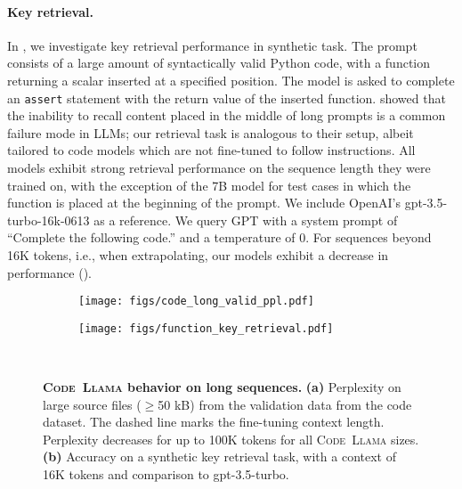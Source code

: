 \documentclass[10pt]{article}
\newcommand{\model}{\textsc{Code~Llama}\xspace}
\begin{document}
\paragraph{Key retrieval.} In , we investigate key retrieval performance in synthetic task.
The prompt consists of a large amount of syntactically valid Python code, with a function returning a scalar inserted at a specified position.
The model is asked to complete an \texttt{assert} statement with the return value of the inserted function.
\citet{liu2023lost} showed that the inability to recall content placed in the middle of long prompts is a common failure mode in LLMs; our retrieval task is analogous to their setup, albeit tailored to code models which are not fine-tuned to follow instructions. 
All models exhibit strong retrieval performance on the sequence length they were trained on, with the exception of the 7B model for test cases in which the function is placed at the beginning of the prompt.
We include OpenAI’s gpt-3.5-turbo-16k-0613 as a reference. We query GPT with a system prompt of ``Complete the following code.'' and a temperature of 0. 
For sequences beyond 16K tokens, i.e., when extrapolating, our models exhibit a decrease in performance ().

\begin{figure}[t!]
     \centering
     \begin{subfigure}[T]{0.45\textwidth}
         \centering
         \texttt{[image: figs/code\_long\_valid\_ppl.pdf]}
         \caption{}
         \label{fig:lcft-code-ppl}
     \end{subfigure}
     \hfill
     \begin{subfigure}[T]{0.45\textwidth}
         \centering
         \texttt{[image: figs/function\_key\_retrieval.pdf]}
         \caption{}
         \label{fig:lcft-key-retrieval}
     \end{subfigure} \\
    \caption{\textbf{\model behavior on long sequences.}
    \textbf{(a)} Perplexity on large source files ($\ge$50 kB) from the validation data from the code dataset. The dashed line marks the fine-tuning context length. Perplexity decreases for up to 100K tokens for all \model sizes.
    \textbf{(b)} Accuracy on a synthetic key retrieval task, with a context of 16K tokens and comparison to gpt-3.5-turbo.
    }
    \label{fig:long_sequences}
\end{figure}
\end{document}

